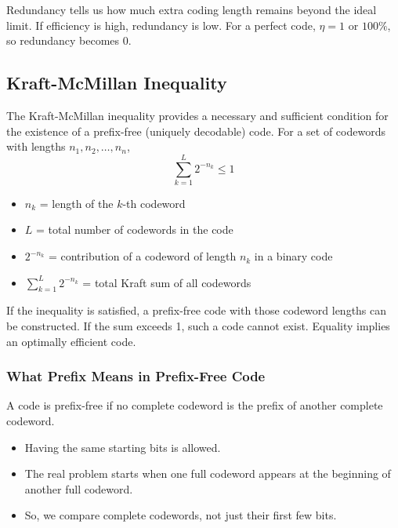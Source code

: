 \documentclass[11pt,a4paper]{book}
\newenvironment{formulabox}[1][Formula]{%
    \begin{tcolorbox}[
        enhanced,
        breakable,
        colback=softcoral!10,
        colframe=softcoral!200,
        title=#1,
        fonttitle=\bfseries,
        coltitle=white,
        sharp corners,
        boxrule=1pt,
        left=8pt,
        right=8pt,
        top=6pt,
        bottom=6pt
    ]
}{\end{tcolorbox}}
\newenvironment{infobox}[1][Information]{%
    \begin{tcolorbox}[
        enhanced,
        breakable,
        colback=mintgreen!10,
        colframe=mintgreen!200,
        title=#1,
        fonttitle=\bfseries,
        sharp corners,
        boxrule=0.8pt,
        left=8pt,
        right=8pt,
        top=6pt,
        bottom=6pt
    ]
}{\end{tcolorbox}}
\begin{document}
Redundancy tells us how much extra coding length remains beyond the ideal limit. If efficiency is high, redundancy is low. For a perfect code, \(\eta=1\) or \(100\%\), so redundancy becomes \(0\).

\subsection{Kraft-McMillan Inequality}

\begin{formulabox}[Kraft-McMillan Inequality]
The Kraft-McMillan inequality provides a necessary and sufficient condition for the existence of a prefix-free (uniquely decodable) code. For a set of codewords with lengths \(n_1,n_2,\ldots,n_n\),
\[
\sum_{k=1}^{L} 2^{-n_k} \le 1
\]
\begin{itemize}
    \item \(n_k\) = length of the \(k\)-th codeword
    \item \(L\) = total number of codewords in the code
    \item \(2^{-n_k}\) = contribution of a codeword of length \(n_k\) in a binary code
    \item \(\sum_{k=1}^{L} 2^{-n_k}\) = total Kraft sum of all codewords
\end{itemize}
If the inequality is satisfied, a prefix-free code with those codeword lengths can be constructed. If the sum exceeds 1, such a code cannot exist. Equality implies an optimally efficient code.
\end{formulabox}

\subsubsection{What Prefix Means in Prefix-Free Code}

A code is prefix-free if no complete codeword is the prefix of another complete codeword.

\begin{infobox}[Simple Reading]
\begin{itemize}
    \item Having the same starting bits is allowed.
    \item The real problem starts when one full codeword appears at the beginning of another full codeword.
    \item So, we compare complete codewords, not just their first few bits.
\end{itemize}
\end{infobox}
\end{document}
